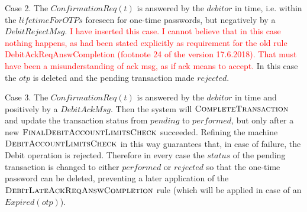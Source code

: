 Case 2. The $ConfirmationReq(t)$ is answered by the $debitor$ in time, i.e. within the $lifetimeForOTPs$ foreseen for one-time passwords, but negatively by a $DebitRejectMsg$. \textcolor{red}{I have inserted this case. I cannot believe that in this case nothing happens, as had been stated explicitly as requirement for the old rule DebitAckReqAnswCompletion (footnote 24 of the version 17.6.2018). That must have been a misunderstanding of ack msg, as if ack means to accept.} In this case the $otp$ is deleted and the pending transaction made $rejected$.

Case 3. The $ConfirmationReq(t)$ is answered by the $debitor$ in time and positively by a $DebitAckMsg$. Then the system will $\hbox{\sc CompleteTransaction}$ and update the transaction status from $pending$ to $performed$, but only after a new $\hbox{\sc FinalDebitAccountLimitsCheck}$ succeeded. Refining the machine $\hbox{\sc DebitAccountLimitsCheck}$ in this way guarantees that, in case of failure, the Debit operation is rejected. Therefore in every case the $status$ of the pending transaction is changed to either $performed$ or $rejected$ so that the one-time password can be deleted,  preventing a later application of the $\hbox{\sc DebitLateAckReqAnswCompletion}$ rule (which will be applied in case of an $Expired(otp)$).


